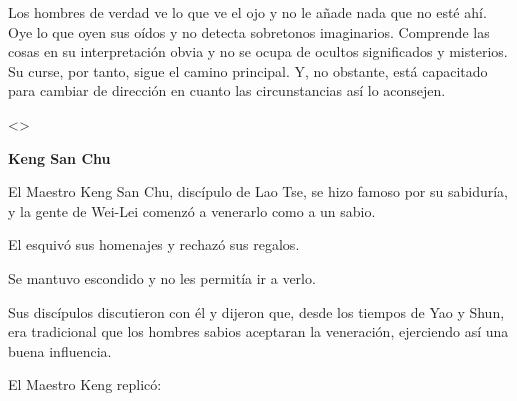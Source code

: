 Los hombres de verdad ve lo que ve el ojo y no le añade nada que no esté
ahí. Oye lo que oyen sus oídos y no detecta sobretonos imaginarios.
Comprende las cosas en su interpretación obvia y no se ocupa de ocultos
significados y misterios. Su curse, por tanto, sigue el camino
principal. Y, no obstante, está capacitado para cambiar de dirección en
cuanto las circunstancias así lo aconsejen.

\textless\textgreater{}

\textbf{{Keng San Chu}}

El Maestro Keng San Chu, discípulo de Lao Tse, se hizo famoso por su
sabiduría, y la gente de Wei-Lei comenzó a venerarlo como a un sabio.

El esquivó sus homenajes y rechazó sus regalos.

Se mantuvo escondido y no les permitía ir a verlo.

Sus discípulos discutieron con él y dijeron que, desde los tiempos de
Yao y Shun, era tradicional que los hombres sabios aceptaran la
veneración, ejerciendo así una buena influencia.

El Maestro Keng replicó:

